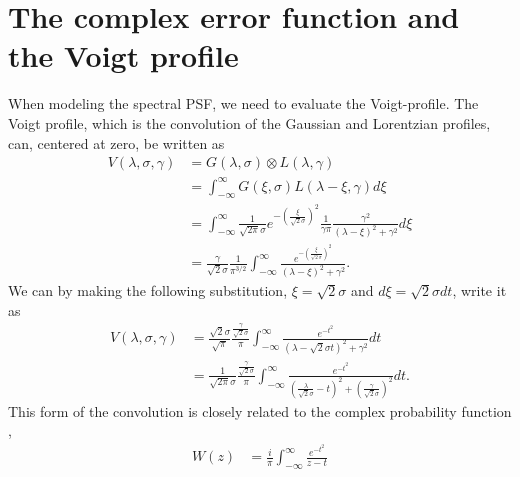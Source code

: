 \documentclass{aa}    %
\begin{document}



\newpage
\appendix



\section{The complex error function and the Voigt profile} \label{voigt}
When modeling the spectral PSF, we need to evaluate the Voigt-profile. The Voigt profile, which is the convolution of the Gaussian and Lorentzian profiles, can, centered at zero, be written as \citep{pagnini2010} 
\begin{equation} 
\begin{split}
V(\lambda,\sigma, \gamma)  
& = G(\lambda, \sigma)  \otimes L(\lambda, \gamma) \\
& = \int_{-\infty}^{\infty} G(\xi, \sigma) L(\lambda - \xi, \gamma) d\xi \\
& = \int_{-\infty}^{\infty} \frac{1}{\sqrt{2 \pi} \sigma} e^{- \left( \frac{\xi}{\sqrt{2} \sigma}  \right)^2 } \frac{1}{\gamma \pi} \frac{\gamma^2}{(\lambda - \xi)^2 + \gamma^2} d\xi \\
& = \frac{\gamma}{\sqrt{2} \sigma} \frac{1}{ \pi^{3/2}}   \int_{-\infty}^{\infty} \frac{e^{- \left( \frac{\xi}{\sqrt{2} \sigma}  \right)^2 }}{(\lambda - \xi)^2 + \gamma^2}.
\end{split}
\end{equation}
We can by making the following substitution, $\xi = \sqrt{2} \sigma$ and $d\xi = \sqrt{2} \sigma dt$, write it as
\begin{equation} 
\begin{split}
V(\lambda,\sigma, \gamma)  
& =  \frac{\sqrt{2} \sigma}{ \sqrt{{\pi}}} \frac{\frac{\gamma}{\sqrt{2} \sigma}}{\pi}  \int_{-\infty}^{\infty} \frac{e^{- t^2 }}{(\lambda - \sqrt{2} \sigma t)^2 + \gamma^2} dt \\
& = \frac{1}{\sqrt{2 \pi} \sigma}  \frac{\frac{\gamma}{\sqrt{2} \sigma}}{\pi}  \int_{-\infty}^{\infty} \frac{e^{- t^2 }}{\left(\frac{\lambda}{\sqrt{2} \sigma} -  t\right)^2 + \left(\frac{\gamma}{\sqrt{2} \sigma}\right)^2} dt.	
\end{split}
\end{equation}
This form of the convolution is closely related to the complex probability function \citep{letchworth2007, abrarov2015a},
\begin{equation} 
\begin{split}
W(z)  
& = \frac{i}{\pi} \int_{-\infty}^{\infty} \frac{e^{-t^2}}{z - t}  
\end{split}
\end{equation}
\end{document}
